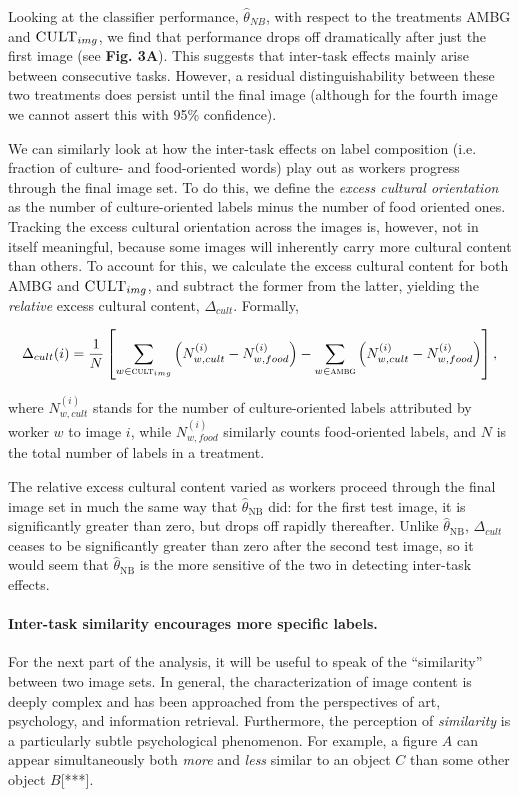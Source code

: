 \documentclass[a4paper]{report}
\begin{document}
Looking at the classifier performance, $\hat{\theta}_{NB}$, with respect to the
treatments \textsc{AMBG} and $\textsc{CULT}_{img}$, we find that performance
drops off dramatically after just the first image (see \textbf{Fig. 3A}).
This suggests that inter-task effects mainly arise between consecutive tasks.
However, a residual distinguishability between these two treatments does 
persist until the final image (although for the fourth image we cannot assert
this with 95\% confidence).

We can similarly look at how the inter-task effects on label composition
(i.e. fraction of culture- and food-oriented words) play out as workers 
progress through the final image set.  To do this, we define the 
\textit{excess cultural orientation} as the number of culture-oriented labels 
minus the number of food oriented ones.  Tracking the excess cultural 
orientation across the images is, however, not in itself meaningful,
because some images will inherently carry more cultural content than others. 
To account for this, we calculate the excess cultural content for both 
\textsc{AMBG} and $\textsc{CULT}_{img}$, and subtract the former from the 
latter, yielding the \textit{relative} excess cultural content, 
$\Delta_{cult}$.  Formally,

\begin{align}
	\Delta_{cult}(i) = \frac{1}{N}\left[ \sum_{w\in\textsc{cult}_{img}} \left(N_{w,cult}^{(i)} - N_{w,food}^{(i)}\right)
	- \sum_{w\in\textsc{ambg}} \left(N_{w,cult}^{(i)} - N_{w,food}^{(i)}\right)\right],
\end{align}

where $N_{w,cult}^{(i)}$ stands for the number of culture-oriented labels 
attributed by worker $w$ to image $i$, while $N_{w,food}^{(i)}$ similarly 
counts food-oriented labels, and $N$ is the total number of labels in a 
treatment.  

The relative excess cultural content varied as workers proceed through the
final image set in much the same way that $\hat{\theta}_\text{NB}$ did: for the
first test image, it is significantly greater than zero, but drops off rapidly
thereafter.  Unlike $\hat{\theta}_\text{NB}$, $\Delta_{cult}$ ceases to
be significantly greater than zero after the second test image, so it would 
seem that $\hat{\theta}_\text{NB}$ is the more sensitive of the two in
detecting inter-task effects.

\paragraph{Inter-task similarity encourages more specific labels.}
For the next part of the analysis, it will be useful to speak of the
``similarity'' between two image sets. In general, the characterization of 
image content 
is deeply complex and has been approached from the perspectives of 
art\cite{panofsky1939studies,shatford1986analyzing},
psychology\cite{Tversky1977327}, and information retrieval\cite{Jaimes20002}.
Furthermore, the perception of \textit{similarity} is a particularly subtle 
psychological phenomenon.  For example, a figure $A$ can appear simultaneously
both \textit{more} and \textit{less} similar to an object $C$ than some other 
object $B$[***].    
\end{document}
